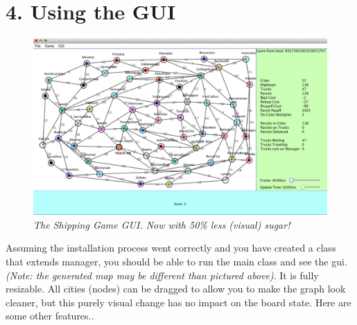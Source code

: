 \documentclass[11pt]{article}
\begin{document}
\section{4. Using the GUI}
\begin{figure}[h]
\centerline{\includegraphics[scale=0.45]{gui.png}} 
\caption{\em{The Shipping Game GUI. Now with 50\% less (visual) sugar!}}
\end{figure}

Assuming the installation process went correctly and you have created a class that extends manager, you should be able to run the main class and see the gui. {\em(Note: the generated map may be different than pictured above)}. It is fully resizable. All cities (nodes) can be dragged to allow you to make the graph look cleaner, but  this purely visual change has no impact on the board state. Here are some other features.. 
\end{document}
